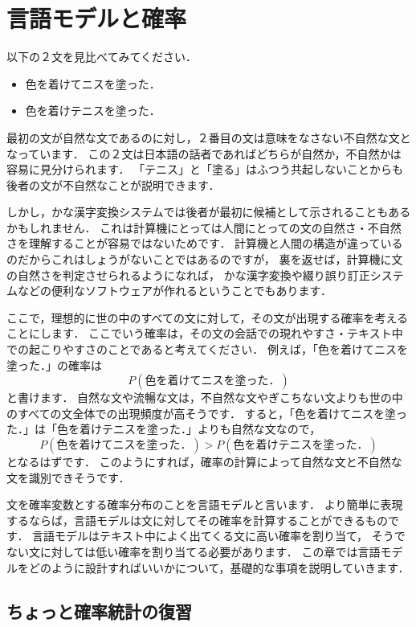 \documentclass[11pt]{report}
\begin{document}
\chapter{言語モデルと確率}

以下の２文を見比べてみてください．
\begin{itemize}
	\item 色を着けてニスを塗った．
	\item 色を着けテニスを塗った．
\end{itemize}
最初の文が自然な文であるのに対し，２番目の文は意味をなさない不自然な文となっています．
この２文は日本語の話者であればどちらが自然か，不自然かは容易に見分けられます．
「テニス」と「塗る」はふつう共起しないことからも後者の文が不自然なことが説明できます．

しかし，かな漢字変換システムでは後者が最初に候補として示されることもあるかもしれません．
これは計算機にとっては人間にとっての文の自然さ・不自然さを理解することが容易ではないためです．
計算機と人間の構造が違っているのだからこれはしょうがないことではあるのですが，
裏を返せば，計算機に文の自然さを判定させられるようになれば，
かな漢字変換や綴り誤り訂正システムなどの便利なソフトウェアが作れるということでもあります．

ここで，理想的に世の中のすべての文に対して，その文が出現する確率を考えることにします．
ここでいう確率は，その文の会話での現れやすさ・テキスト中での起こりやすさのことであると考えてください．
例えば，「色を着けてニスを塗った．」の確率は
\begin{equation*}
	P(\mathrm{色を着けてニスを塗った．})
\end{equation*}
と書けます．
自然な文や流暢な文は，不自然な文やぎこちない文よりも世の中のすべての文全体での出現頻度が高そうです．
すると，「色を着けてニスを塗った．」は「色を着けテニスを塗った．」よりも自然な文なので，
\begin{equation*}
	P(\mathrm{色を着けてニスを塗った．})
	>
	P(\mathrm{色を着けテニスを塗った．})
\end{equation*}
となるはずです．
このようにすれば，確率の計算によって自然な文と不自然な文を識別できそうです．

文を確率変数とする確率分布のことを言語モデルと言います．
より簡単に表現するならば，言語モデルは文に対してその確率を計算することができるものです．
言語モデルはテキスト中によく出てくる文に高い確率を割り当て，
そうでない文に対しては低い確率を割り当てる必要があります．
この章では言語モデルをどのように設計すればいいかについて，基礎的な事項を説明していきます．

\section{ちょっと確率統計の復習}
\end{document}
